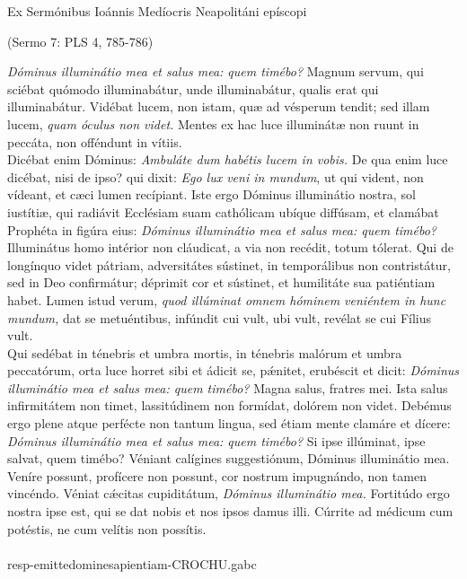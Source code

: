 \documentclass[options]{article}
\begin{document}
	Ex Sermónibus Ioánnis Medíocris Neapolitáni epíscopi
	\begin{flushright}
			(Sermo 7: PLS 4, 785-786)
	\end{flushright}	
	\emph{Dóminus illuminátio mea et salus mea: quem timébo?} Magnum servum, qui sciébat quómodo illuminabátur, unde illuminabátur, qualis erat qui illuminabátur. Vidébat lucem, non istam, quæ ad vésperum tendit; sed illam lucem, \emph{quam óculus non videt.} Mentes ex hac luce illuminátæ non ruunt in peccáta, non offéndunt in vítiis.\\
	Dicébat enim Dóminus: \emph{Ambuláte dum habétis lucem in vobis.} De qua enim luce dicébat, nisi de ipso? qui dixit: \emph{Ego lux veni in mundum}, ut qui vident, non vídeant, et cæci lumen recípiant. Iste ergo Dóminus illuminátio nostra, sol iustítiæ, qui radiávit Ecclésiam suam cathólicam ubíque diffúsam, et clamábat Prophéta in figúra eius: \emph{Dóminus illuminátio mea et salus mea: quem timébo?}\\
	Illuminátus homo intérior non cláudicat, a via non recédit, totum tólerat. Qui de longínquo videt pátriam, adversitátes sústinet, in temporálibus non contristátur, sed in Deo confirmátur; déprimit cor et sústinet, et humilitáte sua patiéntiam habet. Lumen istud verum, \emph{quod illúminat omnem hóminem veniéntem in hunc mundum,} dat se metuéntibus, infúndit cui vult, ubi vult, revélat se cui Fílius vult.\\
	Qui sedébat in ténebris et umbra mortis, in ténebris malórum et umbra peccatórum, orta luce horret sibi et ádicit se, p\'{æ}nitet, erubéscit et dicit: \emph{Dóminus illuminátio mea et salus mea: quem timébo?} Magna salus, fratres mei. Ista salus infirmitátem non timet, lassitúdinem non formídat, dolórem non videt. Debémus ergo plene atque perfécte non tantum lingua, sed étiam mente clamáre et dícere: \emph{Dóminus illuminátio mea et salus mea: quem timébo?} Si ipse illúminat, ipse salvat, quem timébo? Véniant calígines suggestiónum, Dóminus illuminátio mea. Veníre possunt, profícere non possunt, cor nostrum impugnándo, non tamen vincéndo. Véniat c\'{æ}citas cupiditátum, \emph{Dóminus illuminátio mea.} Fortitúdo ergo nostra ipse est, qui se dat nobis et nos ipsos damus illi. Cúrrite ad médicum cum potéstis, ne cum velítis non possítis.\\
	\\
	resp-emittedominesapientiam-CROCHU.gabc
\end{document}
